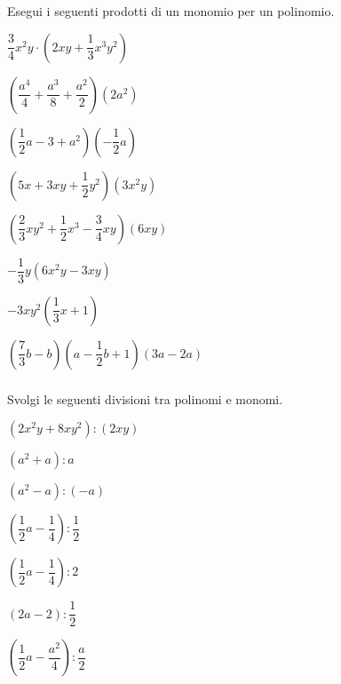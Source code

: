 \begin{esercizio}
\label{ese:10.16}
 Esegui i seguenti prodotti di un monomio per un polinomio.
 \begin{multicols}{2}
\begin{enumeratea}
 \item \(\dfrac{3}{4}x^{2}y\cdot\left(2{xy}+\dfrac{1}{3}x^{3}y^{2}\right)\)
 \item 
\(\left(\dfrac{a^{4}}{4}+\dfrac{a^{3}}{8}+\dfrac{a^{2}}{2}\right)\left(2a^{2}
\right)\)
 \item \(\left(\dfrac{1}{2}a-3+a^{2}\right)\left(-{\dfrac{1}{2}}a\right)\)
 \item \(\left(5x+3{xy}+\dfrac{1}{2}y^{2}\right)\left(3x^{2}y\right)\)
 \item 
\(\left(\dfrac{2}{3}xy^{2}+\dfrac{1}{2}x^{3}-\dfrac{3}{4}{xy}\right)(6{xy})\)
 \item \(-\dfrac{1}{3}y\left(6x^{2}y-3{xy}\right)\)
 \item \(-3xy^2\left(\dfrac{1}{3}x+1\right)\)
 \item \(\left(\dfrac{7}{3}b-b\right)\left(a-\dfrac{1}{2}b+1\right)(3a-2a)\)
\end{enumeratea}
\end{multicols}
\end{esercizio}

\subsubsection*{}

\begin{esercizio}
\label{ese:10.17}
 Svolgi le seguenti divisioni tra polinomi e monomi.
 \begin{multicols}{3}
\begin{enumeratea}
 \item \(\left(2x^{2}y+8{xy}^{2}\right):\left(2{xy}\right)\)
 \item \(\left(a^{2}+a\right):a\)
 \item \(\left(a^{2}-a\right):(-a)\)
 \item \(\left(\dfrac{1}{2}a-\dfrac{1}{4}\right):\dfrac{1}{2}\)
 \item \(\left(\dfrac{1}{2}a-\dfrac{1}{4}\right):2\)
 \item \((2a-2):\dfrac{1}{2}\)
 \item \(\left(\dfrac{1}{2}a-\dfrac{a^{2}}{4}\right):\dfrac{a}{2}\)
\end{enumeratea}
\end{multicols}
\end{esercizio}

